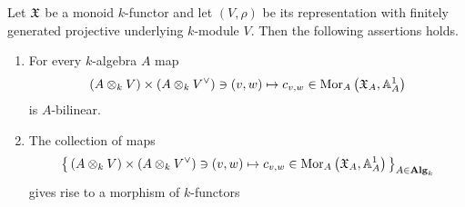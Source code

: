 \begin{proposition}\label{proposition:matrixcoefficientsnatural}
Let ${\mathfrak X}$ be a monoid $k$-functor and let $(V,\rho)$ be its representation with finitely generated projective underlying $k$-module $V$. Then the following assertions holds.
\begin{enumerate}[label=\emph{\textbf{(\arabic*)}}, leftmargin=1.5em]
\item For every $k$-algebra $A$ map
$$\left(A\otimes_kV\right)\times \left(A\otimes_kV^{\vee}\right)\ni (v,w)\mapsto c_{v,w}\in \mathrm{Mor}_A\left({\mathfrak X}_A,\mathbb{A}^1_A\right)$$
is $A$-bilinear.
\item The collection of maps
$$\big\{\left(A\otimes_kV\right)\times \left(A\otimes_kV^{\vee}\right)\ni (v,w)\mapsto c_{v,w}\in \mathrm{Mor}_A\left({\mathfrak X}_A,\mathbb{A}^1_A\right)\big\}_{A\in \mathbf{Alg}_k}$$
gives rise to a morphism of $k$-functors
\begin{center}
\end{center}
\end{enumerate}
\end{proposition}
